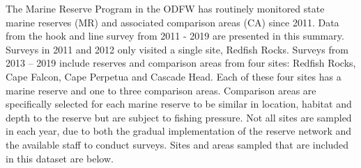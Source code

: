 \documentclass[11pt,
  english,
  a4paper,
]{article}
\begin{document}
\leavevmode\tagmcend\tagstructend\par


The Marine Reserve Program in the ODFW has routinely monitored state marine reserves (MR) and associated comparison areas (CA) since 2011. Data from the hook and line survey from 2011 - 2019 are presented in this summary. Surveys in 2011 and 2012 only visited a single site, Redfish Rocks. Surveys from 2013 -- 2019 include reserves and comparison areas from four sites: Redfish Rocks, Cape Falcon, Cape Perpetua and Cascade Head. Each of these four sites has a marine reserve and one to three comparison areas. Comparison areas are specifically selected for each marine reserve to be similar in location, habitat and depth to the reserve but are subject to fishing pressure. Not all sites are sampled in each year, due to both the gradual implementation of the reserve network and the available staff to conduct surveys. Sites and areas sampled that are included in this dataset are below.

\leavevmode\tagmcend\tagstructend\par

\begingroup\fontsize{10}{12}\selectfont
\begingroup\fontsize{10}{12}\selectfont
\end{document}
